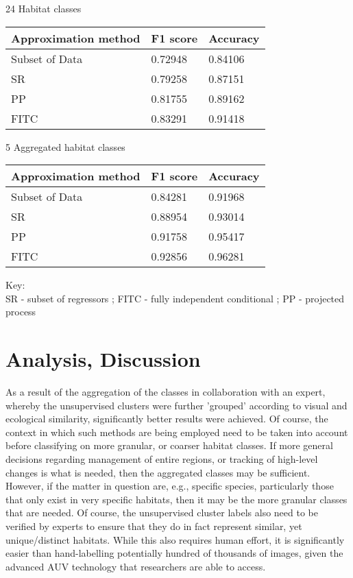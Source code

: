 \documentclass[10pt,sts]{article}
\begin{document}
\begin{multicols}{2}
24 Habitat classes 

\begin{tabular}{| l | l | l |}
    \hline
    Approximation method    & F1 score & Accuracy \\\hline
    Subset of Data          & 0.72948 & 0.84106 \\
    SR                      & 0.79258 & 0.87151 \\
    PP                      & 0.81755 & 0.89162 \\
    FITC                     & 0.83291 & 0.91418 \\
    \hline
\end{tabular}

5 Aggregated habitat classes

\begin{tabular}{|l | l | l|}
    \hline
    Approximation method    & F1 score & Accuracy \\\hline
    Subset of Data          & 0.84281 & 0.91968 \\
    SR                      & 0.88954 & 0.93014 \\
    PP                      & 0.91758 & 0.95417 \\
    FITC                     & 0.92856 & 0.96281 \\
    \hline
\end{tabular}

Key:\\
SR - subset of regressors ; FITC - fully independent conditional ; PP - projected process

\section{Analysis, Discussion}

As a result of the aggregation of the classes in collaboration with an expert, whereby the unsupervised clusters were further 'grouped' according to visual and ecological similarity, significantly better results were achieved. Of course, the context in which such methods are being employed need to be taken into account before classifying on more granular, or coarser habitat classes. If more general decisions regarding management of entire regions, or tracking of high-level changes is what is needed, then the aggregated classes may be sufficient. However, if the matter in question are, e.g., specific species, particularly those that only exist in very specific habitats, then it may be the more granular classes that are needed. Of course, the unsupervised cluster labels also need to be verified by experts to ensure that they do in fact represent similar, yet unique/distinct habitats. While this also requires human effort, it is significantly easier than hand-labelling potentially hundred of thousands of images, given the advanced AUV technology that researchers are able to access.


\end{multicols}
\end{document}
